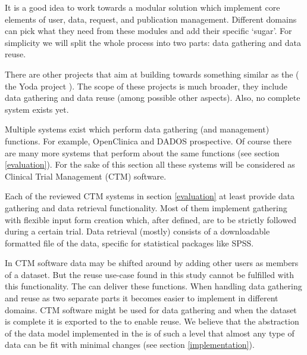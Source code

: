 It is a good idea to work towards a modular solution which implement core elements of user, data, request, and publication management.
Different domains can pick what they need from these modules and add their specific `sugar'.
For simplicity we will split the whole process into two parts: data gathering and data reuse.

There are other projects that aim at building towards something similar as the \ivfsystem{} (\eg{} the Yoda project \cite{yodaGithub, yodaPresentation}).
The scope of these projects is much broader, they include data gathering and data reuse (among possible other aspects).
Also, no complete system exists yet.

Multiple systems exist which perform data gathering (and management) functions.
For example, OpenClinica and DADOS prospective.
Of course there are many more systems that perform about the same functions (see section \ref{evaluation}).
For the sake of this section all these systems will be considered as Clinical Trial Management (CTM) software.

Each of the reviewed CTM systems in section \ref{evaluation} at least provide data gathering and data retrieval functionality.
Most of them implement gathering with flexible input form creation which, after defined, are to be strictly followed during a certain trial.
Data retrieval (mostly) consists of a downloadable formatted file of the data, specific for statistical packages like SPSS.

In CTM software data may be shifted around by adding other users as members of a dataset.
But the reuse use-case found in this study cannot be fulfilled with this functionality.
The \ivfsystem{} can deliver these functions.
When handling data gathering and reuse as two separate parts it becomes easier to implement in different domains.
CTM software might be used for data gathering and when the dataset is complete it is exported to the \ivfsystem{} to enable reuse.
We believe that the abstraction of the data model implemented in the \ivfprototype{} is of such a level that almost any type of data can be fit with minimal changes (see section \ref{implementation}).